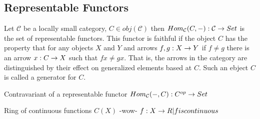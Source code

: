 \documentclass[../../notes.tex]{subfiles}
\begin{document}
\subsection{Representable Functors}

Let $\mathcal{C}$ be a locally small category, $ C \in obj(\mathcal{C}) $
then $ Hom_\mathcal{C} (C, -) : \mathcal{C} \rightarrow Set $ is the set of representable functors. This functor is faithful if the object $C$ has the property that for any objects $X$ and $Y$ and arrows $f, g : X \rightarrow Y$ if $f \neq g$ there is an arrow $x : C \rightarrow X$ such that $fx \neq gx$. That is, the arrows in the category are distinguished by their effect on generalized elements based at $C$. Such an ebject $C$ is called a generator for $C$.

Contravariant of a representable functor
$ Hom_\mathcal{C}(-, C) : C^{op} \rightarrow Set $

Ring of continuous functions $ C(X) $ -wow-
$ {f : X \rightarrow R | f is continuous } $
\end{document}
